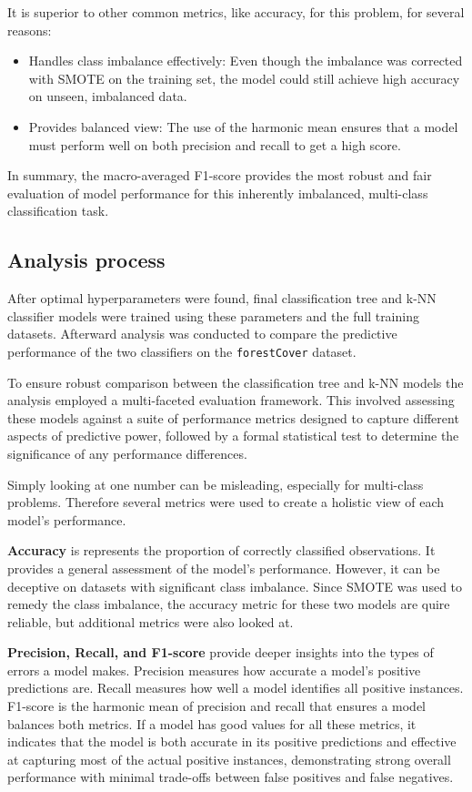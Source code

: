 \documentclass[conference]{IEEEtran}
\begin{document}
It is superior to other common metrics, like accuracy, for this problem, for several reasons:

\begin{itemize}
    \item Handles class imbalance effectively: Even though the imbalance was corrected with SMOTE on the training set, the model could still achieve high accuracy on unseen, imbalanced data.
    \item Provides balanced view: The use of the harmonic mean ensures that a model must perform well on both precision and recall to get a high score.
\end{itemize}

In summary, the macro-averaged F1-score provides the most robust and fair evaluation of model performance for this inherently imbalanced, multi-class classification task.

\subsection{\textbf{Analysis process}}

After optimal hyperparameters were found, final classification tree and k-NN classifier models were trained using these parameters and the full training datasets. Afterward analysis was conducted to compare the predictive performance of the two classifiers on the \texttt{forestCover} dataset.

To ensure robust comparison between the classification tree and k-NN models the analysis employed a multi-faceted evaluation framework. This involved assessing these models against a suite of performance metrics designed to capture different aspects of predictive power, followed by a formal statistical test to determine the significance of any performance differences.

Simply looking at one number can be misleading, especially for multi-class problems. Therefore several metrics were used to create a holistic view of each model's performance.

\textbf{Accuracy} is represents the proportion of correctly classified observations. It provides a general assessment of the model's performance. However, it can be deceptive on datasets with significant class imbalance. Since SMOTE was used to remedy the class imbalance, the accuracy metric for these two models are quire reliable, but additional metrics were also looked at.

\textbf{Precision, Recall, and F1-score} provide deeper insights into the types of errors a model makes. Precision measures how accurate a model's positive predictions are. Recall measures how well a model identifies all positive instances. F1-score is the harmonic mean of precision and recall that ensures a model balances both metrics. If a model has good values for all these metrics, it indicates that the model is both accurate in its positive predictions and effective at capturing most of the actual positive instances, demonstrating strong overall performance with minimal trade-offs between false positives and false negatives.
\end{document}
